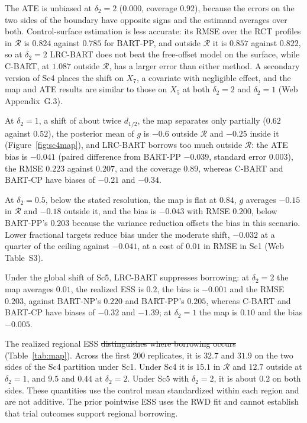 \documentclass[11pt]{article}
\theoremstyle{definition}
\theoremstyle{plain}
\providecommand{\DIFaddtex}[1]{{\protect\color{blue}\uwave{#1}}} %
\providecommand{\DIFdeltex}[1]{{\protect\color{red}\sout{#1}}}                      %
\providecommand{\DIFaddbegin}{} %
\providecommand{\DIFaddend}{} %
\providecommand{\DIFdelbegin}{} %
\providecommand{\DIFdelend}{} %
\providecommand{\DIFadd}[1]{\texorpdfstring{\DIFaddtex{#1}}{#1}} %
\providecommand{\DIFdel}[1]{\texorpdfstring{\DIFdeltex{#1}}{}} %
\newcommand{\DIFscaledelfig}{0.5}
\newlength{\DIFdelgraphicswidth} %
\newlength{\DIFdelgraphicsheight} %
\newcommand{\DIFaddincludegraphics}[2][]{{\color{blue}\fbox{\DIFOincludegraphics[#1]{#2}}}} %
\newcommand{\DIFdelincludegraphics}[2][]{%
\sbox{\DIFdelgraphicsbox}{\DIFOincludegraphics[#1]{#2}}%
\settoboxwidth{\DIFdelgraphicswidth}{\DIFdelgraphicsbox} %
\settoboxtotalheight{\DIFdelgraphicsheight}{\DIFdelgraphicsbox} %
\scalebox{\DIFscaledelfig}{%
\parbox[b]{\DIFdelgraphicswidth}{\usebox{\DIFdelgraphicsbox}\\[-\baselineskip] \rule{\DIFdelgraphicswidth}{0em}}\llap{\resizebox{\DIFdelgraphicswidth}{\DIFdelgraphicsheight}{%
\setlength{\unitlength}{\DIFdelgraphicswidth}%
\begin{picture}(1,1)%
\thicklines\linethickness{2pt} %
{\color[rgb]{1,0,0}\put(0,0){\framebox(1,1){}}}%
{\color[rgb]{1,0,0}\put(0,0){\line( 1,1){1}}}%
{\color[rgb]{1,0,0}\put(0,1){\line(1,-1){1}}}%
\end{picture}%
}\hspace*{3pt}}} %
} %
\DeclareRobustCommand{\DIFaddbegin}{\DIFOaddbegin \let\includegraphics\DIFaddincludegraphics} %
\DeclareRobustCommand{\DIFaddend}{\DIFOaddend \let\includegraphics\DIFOincludegraphics} %
\DeclareRobustCommand{\DIFdelbegin}{\DIFOdelbegin \let\includegraphics\DIFdelincludegraphics} %
\DeclareRobustCommand{\DIFdelend}{\DIFOaddend \let\includegraphics\DIFOincludegraphics} %
\begin{document}
The ATE is unbiased at $\delta_2=2$ ($0.000$, coverage $0.92$), because the errors on the two sides of the boundary have opposite signs and the estimand averages over both. Control-surface estimation is less accurate: its RMSE over the RCT profiles in $\mathcal R$ is $0.824$ against $0.785$ for BART-PP, and outside $\mathcal R$ it is $0.857$ against $0.822$, so at $\delta_2=2$ LRC-BART does not beat the free-offset model on the surface, while C-BART, at $1.087$ outside $\mathcal R$, has a larger error than either method. A secondary version of Sc4 places the shift on $X_7$, a covariate with negligible effect, and the map and ATE results are similar to those on $X_5$ at both $\delta_2=2$ and $\delta_2=1$ (Web Appendix~G.3).

At $\delta_2=1$, a shift of about twice $d_{1/2}$, the map separates only partially ($0.62$ against $0.52$), the posterior mean of $g$ is $-0.6$ outside $\mathcal R$ and $-0.25$ inside it (Figure~\ref{fig:sc4map}), and LRC-BART borrows too much outside $\mathcal R$: the ATE bias is $-0.041$ (paired difference from BART-PP $-0.039$, standard error $0.003$), the RMSE $0.223$ against $0.207$, and the coverage $0.89$, whereas C-BART and BART-CP have biases of $-0.21$ and $-0.34$.

At $\delta_2=0.5$, below the stated resolution, the map is flat at $0.84$, $g$ averages $-0.15$ in $\mathcal R$ and $-0.18$ outside it, and the bias is $-0.043$ with RMSE $0.200$, below BART-PP's $0.203$ because the variance reduction offsets the bias in this scenario. Lower fractional targets reduce bias under the moderate shift, $-0.032$ at a quarter of the ceiling against $-0.041$, at a cost of $0.01$ in RMSE in Sc1 (Web Table~S3).

Under the global shift of Sc5, LRC-BART suppresses borrowing: at $\delta_2=2$ the map averages $0.01$, the realized ESS is $0.2$, the bias is $-0.001$ and the RMSE $0.203$, against BART-NP's $0.220$ and BART-PP's $0.205$, whereas C-BART and BART-CP have biases of $-0.32$ and $-1.39$; at $\delta_2=1$ the map is $0.10$ and the bias $-0.005$.

The realized regional ESS \DIFdelbegin \DIFdel{distinguishes where borrowing occurs }\DIFdelend \DIFaddbegin \DIFadd{summarizes learned local precision }\DIFaddend (Table~\ref{tab:map}). Across the first $200$ replicates, it is $32.7$ and $31.9$ on the two sides of the Sc4 partition under Sc1. Under Sc4 it is $15.1$ in $\mathcal R$ and $12.7$ outside at $\delta_2=1$, and $9.5$ and $0.44$ at $\delta_2=2$. Under Sc5 with $\delta_2=2$, it is about $0.2$ on both sides. These quantities use the control mean standardized within each region and are not additive. The prior pointwise ESS uses the RWD fit and cannot establish that trial outcomes support regional borrowing.
\end{document}
